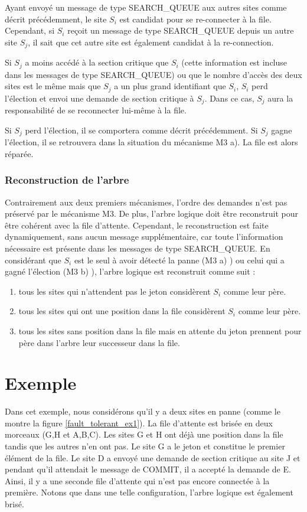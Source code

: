 Ayant envoyé un message de type SEARCH\_QUEUE aux autres sites comme décrit précédemment, le site $S_i$ est candidat pour se re-connecter à la file. Cependant, si $S_i$ reçoit un message de type SEARCH\_QUEUE depuis un autre site $S_j$, il sait que cet autre site est également candidat à la re-connection. 

Si $S_j$ a moins accédé à la section critique que $S_i$ (cette information est incluse dans les messages de type SEARCH\_QUEUE) ou que le nombre d'accès des deux sites est le même mais que $S_j$ a un plus grand identifiant que $S_i$, $S_i$ perd l'élection et envoi une demande de section critique à $S_j$. Dans ce cas, $S_j$ aura la responsabilité de se reconnecter lui-même à la file.

Si $S_j$ perd l'élection, il se comportera comme décrit précédemment. Si $S_j$ gagne l'élection, il se retrouvera dans la situation du mécanisme M3 a). La file est alors réparée.


\subsubsection{Reconstruction de l'arbre\label{tree_rebuild}}
Contrairement aux deux premiers mécanismes, l'ordre des demandes n'est pas préservé par le mécanisme M3. De plus, l'arbre logique doit être reconstruit pour être cohérent avec la file d'attente. Cependant, le reconstruction est faite dynamiquement, sans aucun message supplémentaire, car toute l'information nécessaire est présente dans les messages de type SEARCH\_QUEUE. En considérant que $S_i$ est le seul à avoir détecté la panne (M3 a) ) ou celui qui a gagné l'élection (M3 b) ), l'arbre logique est reconstruit comme suit :
\begin{enumerate}
\item tous les sites qui n'attendent pas le jeton considèrent $S_i$ comme leur père.
\item tous les sites qui ont une position dans la file considèrent $S_i$ comme leur père.
\item tous les sites sans position dans la file mais en attente du jeton prennent pour père dans l'arbre leur successeur dans la file.
\end{enumerate}



\section{Exemple}


Dans cet exemple, nous considérons qu'il y a deux sites en panne (comme le montre la figure \ref{fault_tolerant_ex1}). La file d'attente est brisée en deux morceaux (G,H et A,B,C). Les sites G et H ont déjà une position dans la file tandis que les autres n'en ont pas. Le site G a le jeton et constitue le premier élément de la file. Le site D a envoyé une demande de section critique au site J et pendant qu'il attendait le message de COMMIT, il a accepté la demande de E. Ainsi, il y a une seconde file d'attente qui n'est pas encore connectée à la première. Notons que dans une telle configuration, l'arbre logique est également brisé.

